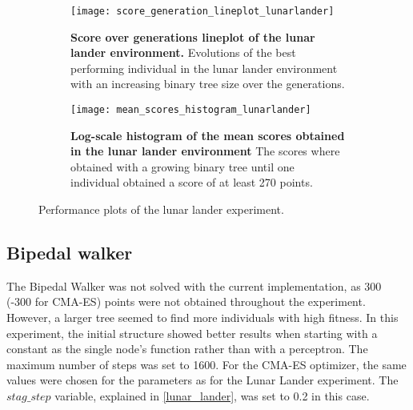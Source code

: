 \begin{figure}[!ht]
    \centering
    \begin{subfigure}{0.48\textwidth}
        \centering
        \texttt{[image: score\_generation\_lineplot\_lunarlander]}  
       	\caption[Score over generations lineplot of the lunar lander environment]{
			\textbf{Score over generations lineplot of the lunar lander environment.} Evolutions of the best performing individual in the lunar lander environment with an increasing binary tree size over the generations.
			}
		\label{fig:lunar_lineplot}
    \end{subfigure}%
    \hspace{1em}
    \begin{subfigure}{0.48\textwidth}
        \centering
        \texttt{[image: mean\_scores\_histogram\_lunarlander]}  
        \caption[Log-scale histogram of the mean scores obtained in the lunar lander environment]{
  			\textbf{Log-scale histogram of the mean scores obtained in the lunar lander environment} The scores where obtained with a growing binary tree until one individual obtained a score of at least 270 points.
  			}
  		\label{fig:lunar_histogram}
    \end{subfigure}
    \caption{Performance plots of the lunar lander experiment.}
    \label{fig:lunar_lander_plots}
\end{figure}

\subsection{Bipedal walker}
The Bipedal Walker was not solved with the current implementation, as 300 (-300 for CMA-ES) points were not obtained throughout the experiment. However, a larger tree seemed to find more individuals with high fitness. In this experiment, the initial structure showed better results when starting with a constant as the single node's function rather than with a perceptron. The maximum number of steps was set to 1600. For the CMA-ES optimizer, the same values were chosen for the parameters as for the Lunar Lander experiment. The $stag\_step$ variable, explained in \ref{lunar_lander}, was set to 0.2 in this case.


